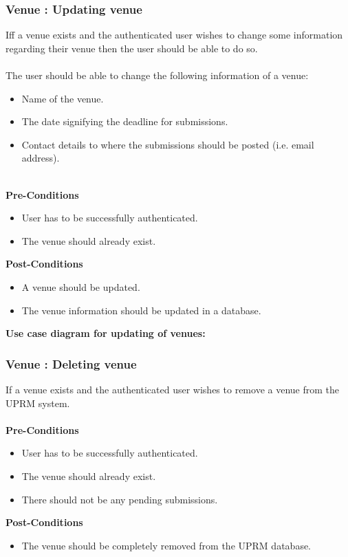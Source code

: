 \subsubsection{Venue : Updating venue}
Iff a venue exists and the authenticated user wishes to change some information regarding their venue then the user should be able to do so. \\ \\
The user should be able to change the following information of a venue: 
\begin{itemize}
	\item Name of the venue.
	\item The date signifying the deadline for submissions.
	\item Contact details to where the submissions should be posted (i.e. email address).\\ \\
\end{itemize}
\textbf{Pre-Conditions}
\begin{itemize}
	\item User has to be successfully authenticated.
	\item The venue should already exist.\\
\end{itemize}
\textbf{Post-Conditions}
\begin{itemize}
	\item A venue should be updated.
	\item The venue information should be updated in a database.\\
\end{itemize}
\textbf{Use case diagram for updating of venues: }\\
\centerline{}

\subsubsection{Venue : Deleting venue}
If a venue exists and the authenticated user wishes to remove a venue from the UPRM system. \\ \\
\textbf{Pre-Conditions}
\begin{itemize}
	\item User has to be successfully authenticated.
	\item The venue should already exist.
	\item There should not be any pending submissions.\\
\end{itemize}
\textbf{Post-Conditions}
\begin{itemize}
	\item The venue should be completely removed from the UPRM database.\\
\end{itemize}

